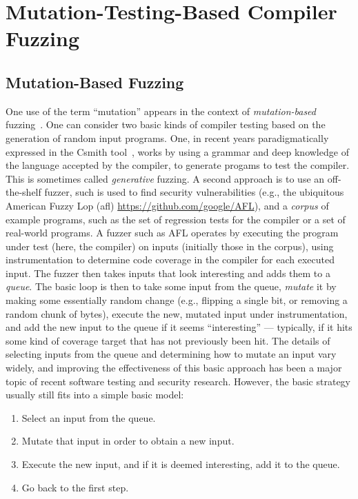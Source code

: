 \section{Mutation-Testing-Based Compiler Fuzzing}



\subsection{Mutation-Based Fuzzing}

One use of the term ``mutation'' appears in the context of \emph{mutation-based} fuzzing~\cite{ArtFuzz}.  One can consider two basic kinds of compiler testing based on the generation of random input programs.  One, in recent years paradigmatically expressed in the Csmith tool~\cite{csmith}, works by using a grammar and deep knowledge of the language accepted by the compiler, to generate progams to test the compiler.  This is sometimes called \emph{generative} fuzzing.  A second approach is to use an off-the-shelf fuzzer, such is used to find security vulnerabilities (e.g., the ubiquitous American Fuzzy Lop (afl) \url{https://github.com/google/AFL}), and a \emph{corpus} of example programs, such as the set of regression tests for the compiler or a set of real-world programs.  A fuzzer such as AFL operates by executing the program under test (here, the compiler) on inputs (initially those in the corpus), using instrumentation to determine code coverage in the compiler for each executed input.  The fuzzer then takes inputs that look interesting and adds them to a \emph{queue}.  The basic loop is then to take some input from the queue, \emph{mutate} it by making some essentially random change (e.g., flipping a single bit, or removing a random chunk of bytes), execute the new, mutated input under instrumentation, and add the new input to the queue if it seems ``interesting'' --- typically, if it hits some kind of coverage target that has not previously been hit.  The details of selecting inputs from the queue and determining how to mutate an input vary widely, and improving the effectiveness of this basic approach has been a major topic of recent software testing and security research.  However, the basic strategy usually still fits into a simple basic model:

\begin{enumerate}
\item Select an input from the queue.
\item Mutate that input in order to obtain a new input.
\item Execute the new input, and if it is deemed interesting, add it to the queue.
\item Go back to the first step.
\end{enumerate}

